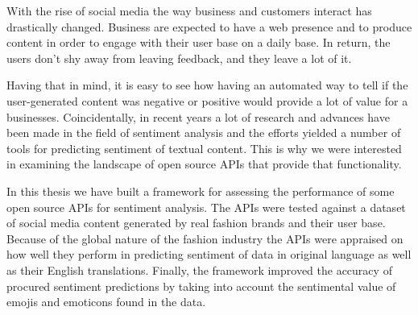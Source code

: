 With the rise of social media the way business and customers interact has drastically changed. 
Business are expected to have a web presence and to produce content in order to engage with their user base on a daily base. 
In return, the users don't shy away from leaving feedback, and they leave a lot of it. 

Having that in mind, it is easy to see how having an automated way to tell if the user-generated content was negative or positive would provide a lot of value for a businesses. 
Coincidentally, in recent years a lot of research and advances have been made in the field of sentiment analysis and the efforts yielded a number of tools for predicting sentiment of textual content.
This is why we were interested in examining the landscape of open source APIs that provide that functionality.

In this thesis we have built a framework for assessing the performance of some  open source  APIs for sentiment analysis. 
The APIs were tested against a dataset of social media content generated by real fashion brands and their user base. 
Because of the global nature of the fashion industry the APIs were appraised on how well they perform in predicting  sentiment of data in original language as well as their English translations. 
Finally, the framework improved  the accuracy of procured sentiment predictions by taking into account the sentimental value of emojis and emoticons found in the data.
